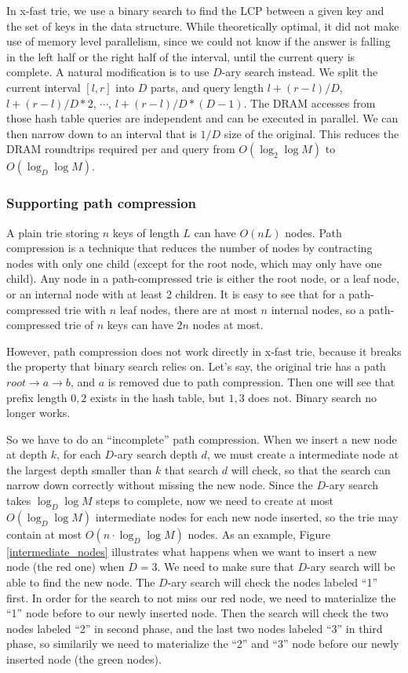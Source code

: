 \documentclass[11pt, usletter]{article}
\begin{document}
In x-fast trie, we use a binary search to find the LCP between a given key and the set of keys in the data structure.
While theoretically optimal, it did not make use of memory level parallelism, 
since we could not know if the answer is falling in the left half or the right half of the interval, 
until the current query is complete. 
A natural modification is to use $D$-ary search instead. 
We split the current interval $[l,r]$ into $D$ parts, 
and query length $l+(r-l)/D$, $l+(r-l)/D*2$, $\cdots$, $l+(r-l)/D*(D-1)$.
The DRAM accesses from those hash table queries are independent and can be executed in parallel.
We can then narrow down to an interval that is $1/D$ size of the original.
This reduces the DRAM roundtrips required per \lookup and \lowerbound query from $O(\log_2\log M)$ to $O(\log_D\log M)$.

\subsubsection*{Supporting path compression}

A plain trie storing $n$ keys of length $L$ can have $O(nL)$ nodes.
Path compression is a technique that reduces the number of nodes by contracting nodes with only one child 
(except for the root node, which may only have one child). 
Any node in a path-compressed trie is either the root node, or a leaf node, or an internal node with at least 2 children. 
It is easy to see that for a path-compressed trie with $n$ leaf nodes, there are at most $n$ internal nodes, 
so a path-compressed trie of $n$ keys can have $2n$ nodes at most.

However, path compression does not work directly in x-fast trie, 
because it breaks the property that binary search relies on. 
Let's say, the original trie has a path $root\rightarrow a\rightarrow b$, 
and $a$ is removed due to path compression. 
Then one will see that prefix length $0,2$ exists in the hash table, 
but $1,3$ does not. Binary search no longer works.

So we have to do an ``incomplete'' path compression. 
When we insert a new node at depth $k$,
for each $D$-ary search depth $d$,
we must create a intermediate node at the largest depth smaller than $k$ that search $d$ will check, 
so that the search can narrow down correctly without missing the new node. 
Since the $D$-ary search takes $\log_D\log M$ steps to complete, 
now we need to create at most $O(\log_D\log M)$ intermediate nodes for each new node inserted, 
so the trie may contain at most $O(n\cdot \log_D\log M)$ nodes. 
As an example, Figure \ref{intermediate_nodes} illustrates what happens when we want to insert
a new node (the red one) when $D=3$. 
We need to make sure that $D$-ary search will be able to find the new node. 
The $D$-ary search will check the nodes labeled ``1'' first. 
In order for the search to not miss our red node, we need to materialize the ``1'' node before to our newly inserted node. 
Then the search will check the two nodes labeled ``2'' in second phase, and the last two nodes labeled ``3'' in third phase,
so similarily we need to materialize the ``2'' and ``3'' node before our newly inserted node (the green nodes).
\end{document}
